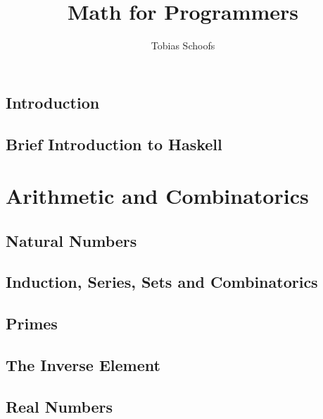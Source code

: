 \documentclass{scrbook}
\begin{document}
\setlength{\parindent}{0pt}
\setlength{\parskip}{8pt}

\title {Math for Programmers}
\author {Tobias Schoofs}
\maketitle
\tableofcontents

\chapter{Introduction} %

\chapter{Brief Introduction to Haskell} %

\part{Arithmetic and Combinatorics}

\chapter{Natural Numbers} %

\chapter{Induction, Series, Sets and Combinatorics}\label{chap:series} %

\chapter{Primes} %

\chapter{The Inverse Element} %

\chapter{Real Numbers} %
\end{document}
